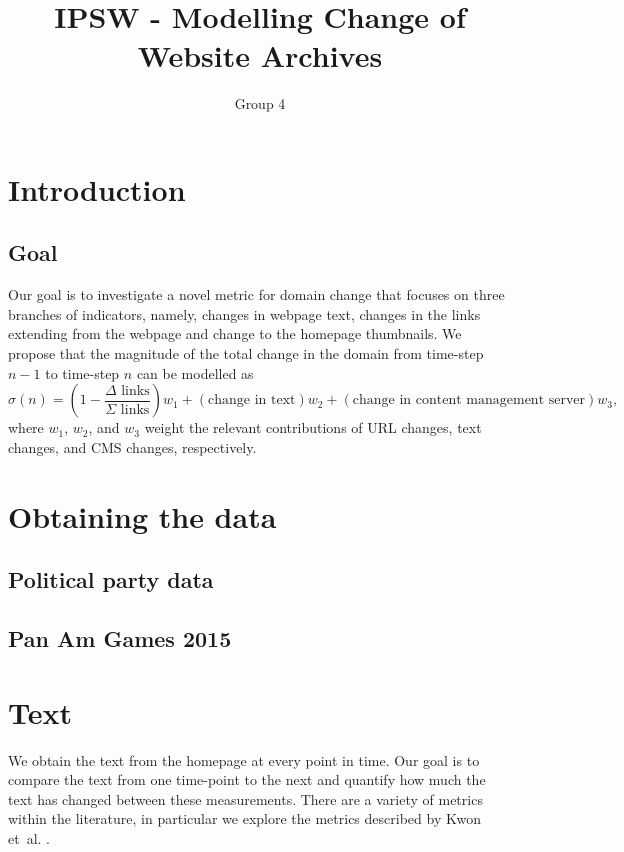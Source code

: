 \documentclass[10pt, a4paper]{article}
\begin{document}
\title{IPSW - Modelling Change of Website Archives}
\author{Group 4}
\date{\vspace{-5ex}}
\maketitle

\section{Introduction}

\subsection{Goal}
Our goal is to investigate a novel metric for domain change that focuses on three branches of indicators, namely, changes in webpage text, changes in the links extending from the webpage and change to the homepage thumbnails. We propose that the  magnitude  of the total change in the domain from time-step $n-1$ to time-step $n$ can be modelled as 
\begin{equation}
\sigma(n) = \left(1-\frac{\Delta\, \,\text{links}}{\Sigma\,\,\text{links}}\right)w_1 + (\text{change in text})w_2 + (\text{change in content management server})w_3,
\end{equation}
where $w_1$, $w_2$, and $w_3$ weight the relevant contributions of URL changes, text changes, and CMS changes, respectively.

\section{Obtaining the data}
\subsection{Political party data}
\subsection{Pan Am Games 2015}

\section{Text}
We obtain the text from the homepage at every point in time. Our goal is to compare the text from one time-point to the next and quantify how much the text has changed between these measurements. There are a variety of metrics within the literature, in particular we explore the metrics described by Kwon et~al.  \cite{kwon2006precise}.
\end{document}
